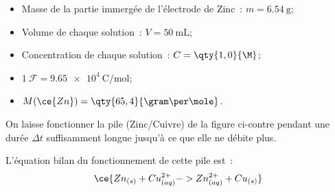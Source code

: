 \begin{minipage}{0.64\linewidth}
    \begin{donnees}
        \begin{itemize}
          \item Masse de la partie immergée de l'électrode de Zinc~:
                $m=\qty{6,54}{\gram}$;
          \item Volume de chaque solution~: $V=\qty{50}{\mL}$;
          \item Concentration de chaque solution~: $C=\qty{1,0}{\M}$;
          \item $1~\mathcal{F}=\qty{9,65e4}{\coulomb\per\mole}$;
          \item $M(\ce{Zn})=\qty{65,4}{\gram\per\mole}$.
        \end{itemize}
    \end{donnees}
    On laisse fonctionner la pile (Zinc/Cuivre) de la figure ci-contre pendant
    une durée $\Delta t$ suffisamment longue jusqu'à ce que elle ne débite plus.
    
    L'équation bilan du fonctionnement de cette pile est~:
    \[
        \ce{Zn_{(s)} + Cu^{2+}_{(aq)} -> Zn^{2+}_{(aq)} + Cu_{(s)}}
    \]
\end{minipage}
\hfill

